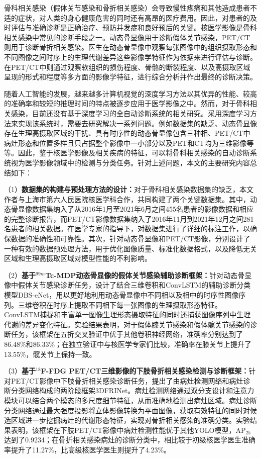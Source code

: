 \begin{cabstract}

    骨科相关感染（假体关节感染和骨折相关感染）会导致慢性疼痛和其他造成患者不适的症状，对人类的身心健康危害的同时还有高昂的医疗费用。因此，对患者的及时评估与准确诊断是正确治疗、预防并发症和良好预后的关键。核医学影像是骨科相关感染中常见的诊断手段之一。动态骨显像用于诊断假体关节感染，PET/CT则用于诊断骨折相关感染。医生在动态骨显像中观察每张图像中的组织摄取形态和不同图像之间时序上的生理代谢差异这些影像学特征作为依据来进行评估与诊断。在PET/CT中则通过观察软组织的损伤程度、骨骼的断裂程度、以及高摄取区域呈现的形式和程度等多方面的影像学特征，进行综合分析并作出最终的诊断决策。

    随着人工智能的发展，越来越多计算机视觉的深度学习方法以其优异的性能、较高的准确率和较短的推理时间的特点被逐步应用于医学影像之中。然而，对于骨科相关感染，目前还没有基于深度学习的全自动诊断系统的相关研究。采用深度学习方法来实现该系统时，需要去研究解决一系列问题。例如数据集的缺乏、动态骨显像存在生理高摄取区域的干扰、具有时序性的动态骨显像包含三种相、PET/CT中病灶形态和位置多样且只占据整个影像中一小部分以及PET和CT均为三维影像等等。因此，鉴于核医学影像及相关疾病的特征，可以将骨科相关感染的自动诊断系统视为医学影像领域中的检测与分类任务。针对上述问题，本文的主要研究内容总结如下：

    （1）\textbf{数据集的构建与预处理方法的设计：}对于骨科相关感染数据集的缺乏，本文作者与上海市第六人民医院核医学科合作，共同构建了两个关键数据集。其中，动态骨显像数据集纳入了从2016年1月至2021年6月之间455名患者的影像数据和相应的完整诊断报告，而PET/CT影像数据集纳入了2016年11月到2021年12月之间281名患者的相关数据。在医学专家的指导下，对数据集进行了详细的标注工作，以确保数据的准确性和可靠性。其次，针对动态骨显像和PET/CT影像，分别设计了一种有效的数据预处理方法，用于优化图像质量、标准化数据格式，以及降低无关区域和生理高摄取区域对模型性能的不利影响。

    （2）\textbf{基于\(^{99m}\)Tc-MDP动态骨显像的假体关节感染辅助诊断框架：}针对动态骨显像中假体关节感染诊断任务，设计了结合三维卷积和ConvLSTM的辅助诊断分类模型DBS-eNet，用以更好地利用动态骨显像中不同相以及相中的时序性图像序列。三维卷积在时序上提取不同相下每一张图像的生理摄取形态特征。ConvLSTM捕捉和丰富单一图像生理形态摄取特征的同时还捕获图像序列中生理代谢的差异变化特征。实验结果表明，对于假体膝关节感染和假体髋关节感染的诊断任务，该框架在五折交叉验证中优于其他卷积神经网络，准确率分别达到了86.48\%和86.33\%；在独立验证中与核医学专家们比较，准确率在膝关节上提升了13.55\%，髋关节上保持一致。

    （3）\textbf{基于\(^{18}\)F-FDG PET/CT三维影像的下肢骨折相关感染检测与诊断框架：}针对PET/CT影像中下肢骨折相关感染诊断任务，提出了由病灶检测网络和病灶诊断分类网络构成的两阶段框架3DFRINet。病灶检测网络通过双分支设计和注意力模块可以结合两个模态的多尺度细节特征，从而准确地检测出病灶区域。病灶诊断分类网络通过最大强度投影将立体影像转换为平面图像，获取有效特征的同时对候选区域进一步挖掘病灶的代谢形态特征，实现对骨折相关感染的准确分类。实验结果表明，该框架在下肢PET/CT影像中病灶检测性能优于其他YOLO模型，AP\(_{25}\)达到了0.9234；在骨折相关感染病灶的诊断分类中，相比较于初级核医学医生准确率提升了11.27\%，比高级核医学医生则提升了4.23\%。


\end{cabstract}
